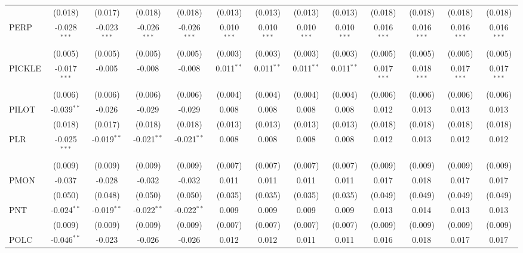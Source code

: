 \begin{table}[!htbp]
\begin{tabular}{@{\extracolsep{5pt}}lcccccccccccc}
  & (0.018) & (0.017) & (0.018) & (0.018) & (0.013) & (0.013) & (0.013) & (0.013) & (0.018) & (0.018) & (0.018) & (0.018) \\
 PERP & -0.028$^{***}$ & -0.023$^{***}$ & -0.026$^{***}$ & -0.026$^{***}$ & 0.010$^{***}$ & 0.010$^{***}$ & 0.010$^{***}$ & 0.010$^{***}$ & 0.016$^{***}$ & 0.016$^{***}$ & 0.016$^{***}$ & 0.016$^{***}$ \\
  & (0.005) & (0.005) & (0.005) & (0.005) & (0.003) & (0.003) & (0.003) & (0.003) & (0.005) & (0.005) & (0.005) & (0.005) \\
 PICKLE & -0.017$^{***}$ & -0.005$^{}$ & -0.008$^{}$ & -0.008$^{}$ & 0.011$^{**}$ & 0.011$^{**}$ & 0.011$^{**}$ & 0.011$^{**}$ & 0.017$^{***}$ & 0.018$^{***}$ & 0.017$^{***}$ & 0.017$^{***}$ \\
  & (0.006) & (0.006) & (0.006) & (0.006) & (0.004) & (0.004) & (0.004) & (0.004) & (0.006) & (0.006) & (0.006) & (0.006) \\
 PILOT & -0.039$^{**}$ & -0.026$^{}$ & -0.029$^{}$ & -0.029$^{}$ & 0.008$^{}$ & 0.008$^{}$ & 0.008$^{}$ & 0.008$^{}$ & 0.012$^{}$ & 0.013$^{}$ & 0.013$^{}$ & 0.013$^{}$ \\
  & (0.018) & (0.017) & (0.018) & (0.018) & (0.013) & (0.013) & (0.013) & (0.013) & (0.018) & (0.018) & (0.018) & (0.018) \\
 PLR & -0.025$^{***}$ & -0.019$^{**}$ & -0.021$^{**}$ & -0.021$^{**}$ & 0.008$^{}$ & 0.008$^{}$ & 0.008$^{}$ & 0.008$^{}$ & 0.012$^{}$ & 0.013$^{}$ & 0.012$^{}$ & 0.012$^{}$ \\
  & (0.009) & (0.009) & (0.009) & (0.009) & (0.007) & (0.007) & (0.007) & (0.007) & (0.009) & (0.009) & (0.009) & (0.009) \\
 PMON & -0.037$^{}$ & -0.028$^{}$ & -0.032$^{}$ & -0.032$^{}$ & 0.011$^{}$ & 0.011$^{}$ & 0.011$^{}$ & 0.011$^{}$ & 0.017$^{}$ & 0.018$^{}$ & 0.017$^{}$ & 0.017$^{}$ \\
  & (0.050) & (0.048) & (0.050) & (0.050) & (0.035) & (0.035) & (0.035) & (0.035) & (0.049) & (0.049) & (0.049) & (0.049) \\
 PNT & -0.024$^{**}$ & -0.019$^{**}$ & -0.022$^{**}$ & -0.022$^{**}$ & 0.009$^{}$ & 0.009$^{}$ & 0.009$^{}$ & 0.009$^{}$ & 0.013$^{}$ & 0.014$^{}$ & 0.013$^{}$ & 0.013$^{}$ \\
  & (0.009) & (0.009) & (0.009) & (0.009) & (0.007) & (0.007) & (0.007) & (0.007) & (0.009) & (0.009) & (0.009) & (0.009) \\
 POLC & -0.046$^{**}$ & -0.023$^{}$ & -0.026$^{}$ & -0.026$^{}$ & 0.012$^{}$ & 0.012$^{}$ & 0.011$^{}$ & 0.011$^{}$ & 0.016$^{}$ & 0.018$^{}$ & 0.017$^{}$ & 0.017$^{}$ \\

\end{tabular}
\end{table}
